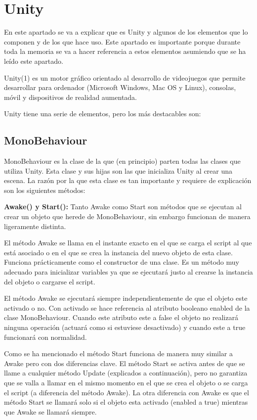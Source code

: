 
\section{Unity \cite{Unity}}
En este apartado se va a explicar que es Unity y algunos de los elementos que lo componen y de los que hace uso. Este apartado es importante porque durante toda la memoria se va a hacer referencia a estos elementos asumiendo que se ha leído este apartado.

Unity(1) es un motor gráfico orientado al desarrollo de videojuegos que permite desarrollar para ordenador (Microsoft Windows, Mac OS y Linux), consolas, móvil y dispositivos de realidad aumentada.

Unity tiene una serie de elementos, pero los más destacables son:

\subsection{MonoBehaviour}
MonoBehaviour es la clase de la que (en principio) parten todas las clases que utiliza Unity. Esta clase y sus hijas son las que inicializa Unity al crear una escena. La razón por la que esta clase es tan importante y requiere de explicación son los siguientes métodos:

\textbf{Awake() y Start():} Tanto Awake como Start son métodos que se ejecutan al crear un objeto que herede de MonoBehaviour, sin embargo funcionan de manera ligeramente distinta. 

El método Awake se llama en el instante exacto en el que se carga el script al que está asociado o en el que se crea la instancia del nuevo objeto de esta clase. Funciona prácticamente como el constructor de una clase. Es un método muy adecuado para inicializar variables ya que se ejecutará justo al crearse la instancia del objeto o cargarse el script. 

El método Awake se ejecutará siempre independientemente de que el objeto este activado o no. Con activado se hace referencia al atributo booleano enabled de la clase MonoBehaviour. Cuando este atributo este a false el objeto no realizará ninguna operación (actuará como si estuviese desactivado) y cuando este a true funcionará con normalidad.

Como se ha mencionado el método Start funciona de manera muy similar a Awake pero con dos diferencias clave. El método Start se activa antes de que se llame a cualquier método Update (explicados a continuación), pero no garantiza que se valla a llamar en el mismo momento en el que se crea el objeto o se carga el script (a diferencia del método Awake). La otra diferencia con Awake es que el método Start se llamará solo si el objeto esta activado (enabled a true) mientras que Awake se llamará siempre.\\



